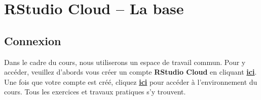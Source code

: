 \documentclass[10.5pt,a4paper]{article}
\begin{document}
\section{RStudio Cloud -- La base}
  \subsection{Connexion}
  Dans le cadre du cours, nous utiliserons un espace de travail commun. Pour y accéder, veuillez d'abords vous créer un compte \textbf{RStudio Cloud} en cliquant \href{https://login.rstudio.cloud/register?redirect=https\%3A\%2F\%2Fclient.login.rstudio.cloud\%2Foauth\%2Flogin\%3Fshow_auth\%3D0\%26show_login\%3D0\%26show_setup\%3D0}{\textbf{ici}}. Une fois que votre compte est créé, cliquez \href{https://can01.safelinks.protection.outlook.com/?url=https\%3A\%2F\%2Flogin.rstudio.cloud\%2Finvite\%3Fspace_name\%3DPOL\%2B2000-Z\%2BM\%25C3\%25A9thodes\%2Bquantitatives\%26code\%3D9tltN\%252ByVLqitCL1rVgCB\%252F\%252B0V8rk0Wtqxp\%252Fl6uW8J&amp;data=04\%7C01\%7Cwilliam.poirier.1\%40ulaval.ca\%7C9119a0b3a3fa4119007208d987439312\%7C56778bd56a3f4bd3a26593163e4d5bfe\%7C1\%7C0\%7C637689547430424200\%7CUnknown\%7CTWFpbGZsb3d8eyJWIjoiMC4wLjAwMDAiLCJQIjoiV2luMzIiLCJBTiI6Ik1haWwiLCJXVCI6Mn0\%3D\%7C0&amp;sdata=EMbletbv2\%2Bu9\%2FKSqkqJbRadybcaee2t2S2\%2F8MNRvJgQ\%3D&amp;reserved=0}{\textbf{ici}} pour accéder à l'environnement du cours. Tous les exercices et travaux pratiques s’y trouvent.
  
\end{document}
